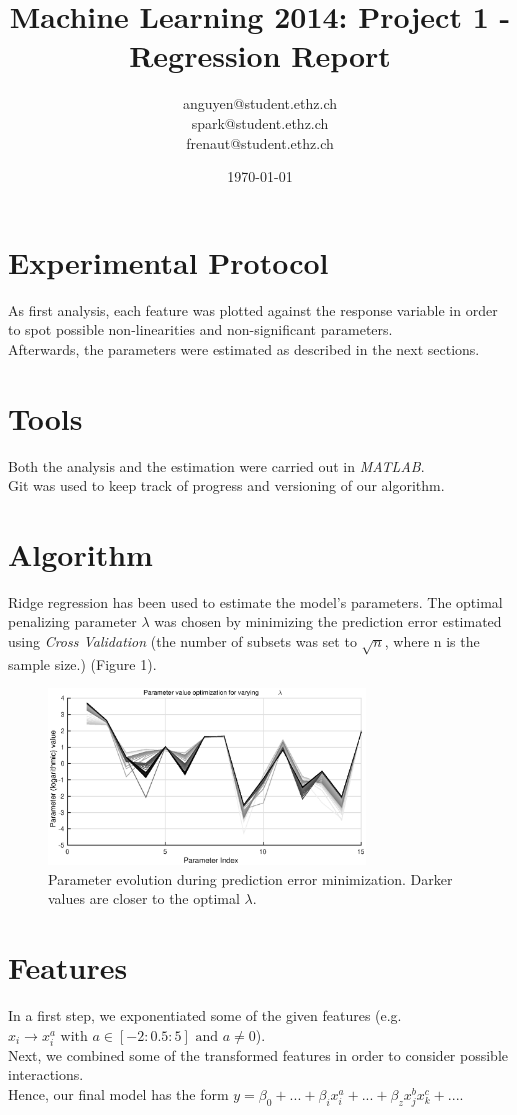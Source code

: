 \documentclass[a4paper, 11pt]{article}
\title{Machine Learning 2014: Project 1 - Regression Report}
\author{anguyen@student.ethz.ch\\ spark@student.ethz.ch\\ frenaut@student.ethz.ch\\}
\date{\today}
\begin{document}
\maketitle

\section*{Experimental Protocol}
As first analysis, each feature was plotted against the response variable in order to spot possible non-linearities and non-significant parameters.\\
Afterwards, the parameters were estimated as described in the next sections.

\section{Tools}
Both the analysis and the estimation were carried out in \emph{MATLAB}. \\
Git was used to keep track of progress and versioning of our algorithm.

\section{Algorithm}
Ridge regression has been used to estimate the model's parameters. The optimal penalizing parameter $\lambda$ was chosen by minimizing the prediction error estimated using \emph{Cross Validation} (the number of subsets was set to $\sqrt{n}$, where n is the sample size.) (Figure 1). 
\begin{figure}[h!]
  \label{gull}
  \centering
    \includegraphics[width=0.75\textwidth]{../figures/PredictorsVsLambda.eps}
  \caption{Parameter evolution during prediction error minimization. Darker values are closer to the optimal $\lambda$.}
\end{figure}

\section{Features}
In a first step, we exponentiated some of the given features (e.g. $x_i \rightarrow x_i^a \text{ with } a \in [-2:0.5:5] \text{ and } a \neq 0$). \\
Next, we combined some of the transformed features in order to consider possible interactions. \\
Hence, our final model has the form $ y = \beta_0 + ... + \beta_i x_i^a + ... + \beta_z x_j^b x_k^c + ... $.
\end{document}
